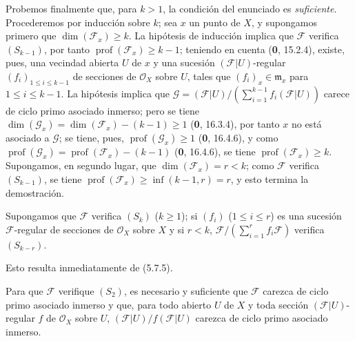 Probemos finalmente que, para $k>1$, la condición del enunciado es \emph{suficiente}.
Procederemos por inducción sobre $k$; sea $x$ un punto de $X$, y supongamos
primero que $\dim(\mathscr F_x)\geq k$. La hipótesis de inducción implica que
$\mathscr F$ verifica $(S_{k-1})$, por tanto
$\operatorname{prof}(\mathscr F_x)\geq k-1$; teniendo en cuenta (\textbf 0, 15.2.4),
existe, pues, una vecindad abierta $U$ de $x$ y una sucesión
$(\mathscr F|U)$-regular $(f_i)_{1\leq i\leq k-1}$ de secciones de
$\mathcal O_X$ sobre $U$, tales que $(f_i)_x\in\mathfrak m_x$ para
$1\leq i\leq k-1$. La hipótesis implica que
$\mathscr G=(\mathscr F|U)/(\sum_{i=1}^{k-1}
f_i(\mathscr F|U))$
carece de ciclo primo asociado inmerso; pero se tiene
$\dim(\mathscr G_x)=\dim(\mathscr F_x)-(k-1)\geq1$ (\textbf 0, 16.3.4), por tanto $x$
no está asociado a $\mathscr G$; se tiene, pues,
$\operatorname{prof}(\mathscr G_x)\geq1$ (\textbf 0, 16.4.6), y como
$\operatorname{prof}(\mathscr G_x)=\operatorname{prof}(\mathscr F_x)-(k-1)$
(\textbf 0, 16.4.6), se tiene $\operatorname{prof}(\mathscr F_x)\geq k$. Supongamos,
en segundo lugar, que $\dim(\mathscr F_x)=r<k$; como $\mathscr F$ verifica
$(S_{k-1})$, se tiene
$\operatorname{prof}(\mathscr F_x)\geq\inf(k-1,r)=r$, y esto termina la
demostración.

\begin{corollary}[5.7.6]
\label{IV.2.s5.7.6-fr}
Supongamos que $\mathscr F$ verifica $(S_k)$ ($k\geq1$); si
$(f_i)$ ($1\leq i\leq r$) es una sucesión $\mathscr F$-regular de secciones
de $\mathcal O_X$ sobre $X$ y si $r<k$,
$\mathscr F/(\sum_{i=1}^r f_i\mathscr F)$ verifica $(S_{k-r})$.
\end{corollary}

Esto resulta inmediatamente de (5.7.5).

\begin{corollary}[5.7.7]
\label{IV.2.s5.7.7-fr}
Para que $\mathscr F$ verifique $(S_2)$, es necesario y suficiente que
$\mathscr F$ carezca de ciclo primo asociado inmerso y que, para todo abierto
$U$ de $X$ y toda sección $(\mathscr F|U)$-regular $f$ de $\mathcal O_X$
sobre $U$, $(\mathscr F|U)/f(\mathscr F|U)$ carezca de ciclo primo asociado
inmerso.
\end{corollary}

